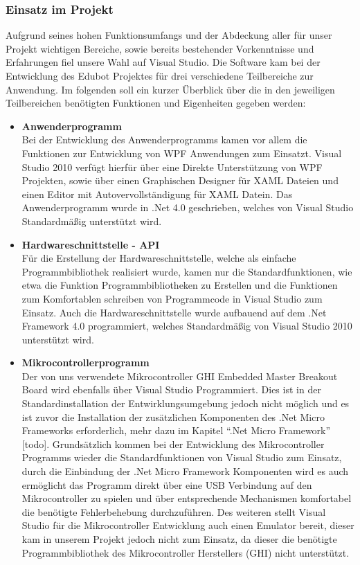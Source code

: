 \subsubsection{Einsatz im Projekt}
Aufgrund seines hohen Funktionsumfangs und der Abdeckung aller für unser Projekt wichtigen Bereiche, sowie bereits bestehender Vorkenntnisse und Erfahrungen fiel unsere Wahl auf Visual Studio.
Die Software kam bei der Entwicklung des Edubot Projektes für drei verschiedene Teilbereiche zur Anwendung. Im folgenden soll ein kurzer Überblick über die in den jeweiligen Teilbereichen benötigten Funktionen und Eigenheiten gegeben werden:
\begin{itemize}
\item \textbf{Anwenderprogramm}\\
Bei der Entwicklung des Anwenderprogramms kamen vor allem die Funktionen zur Entwicklung von WPF Anwendungen zum Einsatzt. Visual Studio 2010 verfügt hierfür über eine Direkte Unterstützung von WPF Projekten, sowie über einen Graphischen Designer für XAML Dateien und einen Editor mit Autovervollständigung für XAML Datein. Das Anwenderprogramm wurde in .Net 4.0 geschrieben, welches von Visual Studio Standardmäßig unterstützt wird.
\item \textbf{Hardwareschnittstelle - API}\\
Für die Erstellung der Hardwareschnittstelle, welche als einfache Programmbibliothek realisiert wurde, kamen nur die Standardfunktionen, wie etwa die Funktion Programmbibliotheken zu Erstellen und die Funktionen zum Komfortablen schreiben von Programmcode in Visual Studio zum Einsatz. Auch die Hardwareschnittstelle wurde aufbauend auf dem .Net Framework 4.0 programmiert, welches Standardmäßig von Visual Studio 2010 unterstützt wird.
\item \textbf{Mikrocontrollerprogramm}\\
Der von uns verwendete Mikrocontroller GHI Embedded Master Breakout Board wird ebenfalls über Visual Studio Programmiert. Dies ist in der Standardinstallation der Entwirklungsumgebung jedoch nicht möglich und es ist zuvor die Installation der zusätzlichen Komponenten des .Net Micro Frameworks erforderlich, mehr dazu im Kapitel “.Net Micro Framework” [todo].
Grundsätzlich kommen bei der Entwicklung des Mikrocontroller Programms wieder die Standardfunktionen von Visual Studio zum Einsatz, durch die Einbindung der .Net Micro Framework Komponenten wird es auch ermöglicht das Programm direkt über eine USB Verbindung auf den Mikrocontroller zu spielen und über entsprechende Mechanismen komfortabel die benötigte Fehlerbehebung durchzuführen.
Des weiteren stellt Visual Studio für die Mikrocontroller Entwicklung auch einen Emulator bereit, dieser kam in unserem Projekt jedoch nicht zum Einsatz, da dieser die benötigte Programmbibliothek des Mikrocontroller Herstellers (GHI) nicht unterstützt.
\end{itemize}